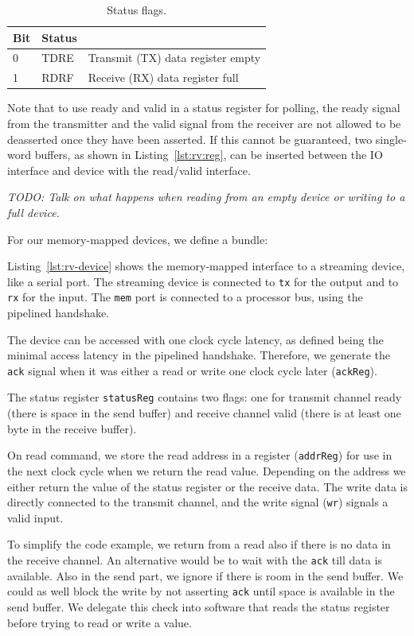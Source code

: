 \documentclass[%
    10pt,
    headinclude, footexclude,
    openright, %
    notitlepage,
    cleardoubleempty,
    headsepline,
    pointlessnumbers,
    bibtotoc, idxtotoc,
    ]{scrbook}
\newcommand{\code}[1]{{\lstinline[basicstyle=\small\ttfamily]{#1}}}
\newcommand{\todo}[1]{{\emph{TODO: #1}}}
\begin{document}
\begin{table}
\centering
\begin{tabular}{lll}
\toprule
Bit & Status & \\
\midrule
0 & TDRE & Transmit (TX) data register empty \\
1 & RDRF & Receive (RX) data register full \\
\bottomrule
\end{tabular}
\caption{Status flags.}
\label{tab:addr:uart:status}
\end{table}

Note that to use ready and valid in a status register for polling, the ready signal from
the transmitter and the valid signal from the receiver are not allowed to be deasserted
once they have been asserted. If this cannot be guaranteed, two single-word buffers,
as shown in Listing~\ref{lst:rv:reg}, can be inserted between the IO interface and
device with the read/valid interface.

\todo{Talk on what happens when reading from an empty device or writing to a full device.}

For our memory-mapped devices, we define a bundle:


Listing~\ref{lst:rv-device} shows the memory-mapped interface to a streaming
device, like a serial port. The streaming device is connected to \code{tx} for the output
and to \code{rx} for the input. The \code{mem} port is connected to a processor bus,
using the pipelined handshake.

The device can be accessed with one clock cycle latency, as defined being the minimal
access latency in the pipelined handshake. Therefore, we generate the \code{ack}
signal when it was either a read or write one clock cycle later (\code{ackReg}).

The status register \code{statusReg} contains two flags: one for transmit channel ready
(there is space in the send buffer) and receive channel valid (there is at least one byte
in the receive buffer).

On read command, we store the read address in a register (\code{addrReg})
for use in the next clock cycle when we return the read value. Depending on the address
we either return the value of the status register or the receive data.
The write data is directly connected to the transmit channel, and the write signal
(\code{wr}) signals a valid input.


To simplify the code example, we return from a read also if there is no data in the
receive channel. An alternative would be to wait with the \code{ack} till
data is available. Also in the send part, we ignore if there is room in the
send buffer. We could as well block the write by not asserting \code{ack}
until space is available in the send buffer.
We delegate this check into software that reads the status register before trying
to read or write a value.
\end{document}
